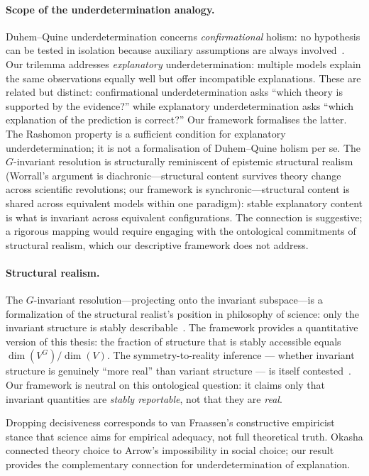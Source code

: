 \documentclass[11pt,a4paper]{article}
\begin{document}
\paragraph{Scope of the underdetermination analogy.}
Duhem--Quine underdetermination concerns \emph{confirmational} holism: no hypothesis can be tested in isolation because auxiliary assumptions are always involved~\cite{stanford2006exceeding}. Our trilemma addresses \emph{explanatory} underdetermination: multiple models explain the same observations equally well but offer incompatible explanations. These are related but distinct: confirmational underdetermination asks ``which theory is supported by the evidence?'' while explanatory underdetermination asks ``which explanation of the prediction is correct?'' Our framework formalises the latter. The Rashomon property is a sufficient condition for explanatory underdetermination; it is not a formalisation of Duhem--Quine holism per se. The $G$-invariant
resolution is structurally reminiscent of epistemic structural
realism \citep{worrall1989structural}
(Worrall's argument is diachronic---structural content survives theory change
across scientific revolutions; our framework is synchronic---structural content
is shared across equivalent models within one paradigm): stable explanatory
content is what is invariant across equivalent configurations. The connection
is suggestive; a rigorous mapping would require engaging with the ontological
commitments of structural realism, which our descriptive framework does not
address.

\paragraph{Structural realism.}
The $G$-invariant resolution---projecting onto the invariant subspace---is a formalization of the structural realist's position in philosophy of science: only the invariant structure is stably describable~\citep{worrall1989structural,ladyman2007every}.  The framework provides a quantitative version of this thesis: the fraction of structure that is stably accessible equals $\dim(V^G)/\dim(V)$.  The symmetry-to-reality inference --- whether invariant structure is genuinely ``more real'' than variant structure --- is itself contested~\citep{dasgupta2016symmetry}.  Our framework is neutral on this ontological question: it claims only that invariant quantities are \emph{stably reportable}, not that they are \emph{real}.

Dropping decisiveness corresponds to van
Fraassen's \citep{vanfraassen1980scientific} constructive empiricist stance
that science aims for empirical adequacy, not full theoretical truth.
Okasha \citep{okasha2011theory} connected theory choice to Arrow's impossibility
in social choice; our result provides the complementary connection for
underdetermination of explanation.
\end{document}
